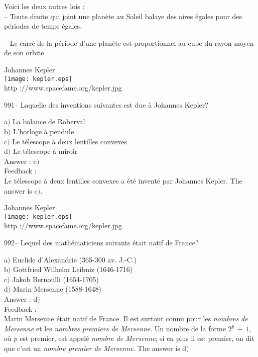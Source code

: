 \documentclass[letterpaper, 12pt]{article}
\begin{document}
Voici les deux autres lois :\\
-- Toute droite qui joint une plan\`ete au Soleil balaye des aires \'egales
pour des p\'eriodes de temps \'egales.

-- Le carr\'e de la p\'eriode d'une plan\`ete est proportionnel au
cube du rayon moyen de son orbite.
\\

        \begin{center}
        Johannes Kepler\\
    \texttt{[image: kepler.eps]}\\
        {\footnotesize http ://www.spacefame.org/kepler.jpg}
    \end{center}

991-- Laquelle des inventions suivantes est due \`a Johannes Kepler?

a$)$ La balance de Roberval \\
b$)$ L'horloge \`a pendule \\
c$)$ Le t\'elescope \`a deux lentilles convexes \\
d$)$ Le t\'elescope \`a miroir\\

Answer : c$)$\\

Feedback : \\
Le t\'elescope \`a deux lentilles convexes a \'et\'e invent\'e par
Johannes Kepler.
The answer is c$)$.\\

        \begin{center}
        Johannes Kepler\\
    \texttt{[image: kepler.eps]}\\
        {\footnotesize http ://www.spacefame.org/kepler.jpg}
    \end{center}

992-- Lequel des math\'ematiciens suivants \'etait natif de France?

a$)$ Euclide d'Alexandrie (365-300 av. J.-C.) \\
b$)$ Gottfried Wilhelm Leibniz (1646-1716) \\
c$)$ Jakob Bernoulli (1654-1705) \\
d$)$ Marin Mersenne (1588-1648)\\

Answer : d$)$\\

Feedback : \\
Marin Mersenne \'etait natif de France. Il est surtout connu pour
les {\sl nombres de Mersenne} et les {\sl nombres premiers de
Mersenne}. Un nombre de la forme $2^p\,-\,1$, o\`u $p$ est premier,
est appel\'e {\sl nombre de Mersenne}; si en plus il est premier, on
dit que c'est un {\sl nombre premier de Mersenne}.
The answer is d$)$.\\
\end{document}
